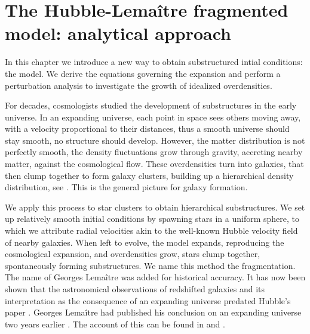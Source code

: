 
\chapter{The Hubble-Lema\^itre fragmented model: analytical approach} 
\label{Chap:analytical}

In this chapter we introduce a new way to obtain substructured intial conditions: the \HubLem model. We derive the equations governing the expansion and perform a perturbation analysis to investigate the growth of idealized overdensities.

\minitoc







For decades, cosmologists studied the development of substructures in the early universe. In an expanding universe, each point in space sees others moving away, with a velocity proportional to their distances, thus a smooth universe should stay smooth, no structure should develop. However, the matter distribution is not perfectly smooth, the density fluctuations grow through gravity, accreting nearby matter, against the cosmological flow.  These overdensities turn into galaxies, that then clump together to form galaxy clusters, building up a hierarchical density distribution, see \cite{White1978,Aarseth1979}. This is the general picture for galaxy formation.

We apply this process to star clusters to obtain hierarchical substructures. We set up relatively smooth initial conditions by spawning stars in a uniform sphere, to which we attribute radial velocities  akin to the well-known Hubble velocity field of nearby galaxies. When left to evolve, the model expands, reproducing the cosmological expansion, and overdensities grow, stars clump together, spontaneously forming substructures. We name this method the \HubLem fragmentation. The name of Georges Lema\^itre was added for historical accuracy. It has now been shown that the astronomical observations of redshifted galaxies and its interpretation as the consequence of an expanding universe predated Hubble's paper \citep{Hubble1929}. Georges Lema\^itre had published his conclusion on an expanding universe two years earlier \citep{Lemaitre1927}. The account of this can be found in \cite{Kragh2003,VanDenBergh2011} and \cite{Freeman2015}.

